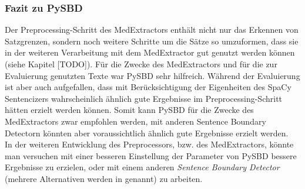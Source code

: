 \subsubsection{Fazit zu PySBD}
Der Preprocessing-Schritt des MedExtractors enthält nicht nur das Erkennen von Satzgrenzen, sondern noch weitere Schritte um die Sätze so umzuformen, dass sie in der weiteren Verarbeitung mit dem MedExtractor gut genutzt werden können (siehe Kapitel [TODO]). Für die Zwecke des MedExtractors und für die zur Evaluierung genutzten Texte war PySBD sehr hilfreich. Während der Evaluierung ist aber auch aufgefallen, dass mit Berücksichtigung der Eigenheiten des SpaCy Sentencizers wahrscheinlich ähnlich gute Ergebnisse im Preprocessing-Schritt hätten erzielt werden können. Somit kann PySBD für die Zwecke des MedExtractors zwar empfohlen werden, mit anderen Sentence Boundary Detectorn könnten aber voraussichtlich ähnlich gute Ergebnisse erzielt werden. \\
In der weiteren Entwicklung des Preprocessors, bzw. des MedExtractors, könnte man versuchen mit einer besseren Einstellung der Parameter von PySBD bessere Ergebnisse zu erzielen, oder mit einem anderen \emph{Sentence Boundary Detector} (mehrere Alternativen werden in \cite{sadvilkar_pysbd_2020} genannt) zu arbeiten.

